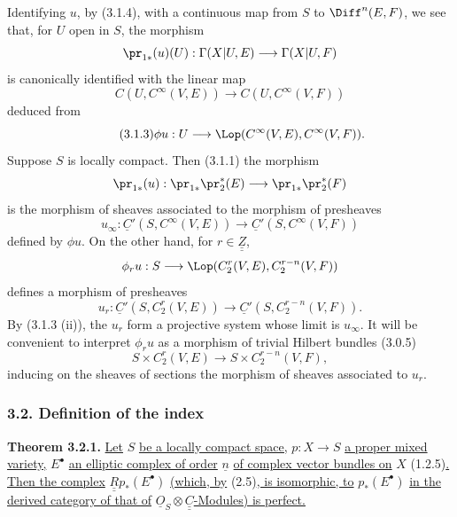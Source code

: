 %
Identifying $u$, by (3.1.4), with a continuous map from $S$ to $\Diff^n(E,F)$, we see that, for $U$ open in $S$, the morphism
\[
  \pr_{1*}(u)(U):\Gamma(X|U,E)\longrightarrow \Gamma(X|U,F)
\]
is canonically identified with the linear map
\[
  C(U,C^\infty(V,E))\longrightarrow C(U,C^\infty(V,F))
\]
deduced from
\begin{equation}\tag{3.1.3}
  \phi u:U\longrightarrow \Lop(C^\infty(V,E),C^\infty(V,F)).
\end{equation}
Suppose $S$ is locally compact. Then (3.1.1) the morphism
\[
  \pr_{1*}(u):\pr_{1*}\pr_2^*(E)
  \longrightarrow \pr_{1*}\pr_2^*(F)
\]
is the morphism of sheaves associated to the morphism of presheaves
\[
  u_\infty:\underline C'(S,C^\infty(V,E))
  \longrightarrow \underline C'(S,C^\infty(V,F))
\]
defined by $\phi u$. On the other hand, for $r\in\underline{\underline{Z}}$,
\[
  \phi_r u:S\longrightarrow \Lop(C^r_2(V,E),C^{r-n}_2(V,F))
\]
defines a morphism of presheaves
\[
  u_r:\underline C'(S,C^r_2(V,E))
  \longrightarrow \underline C'(S,C^{r-n}_2(V,F)).
\]
By (3.1.3 (ii)), the $u_r$ form a projective system whose limit is $u_\infty$. It will be convenient to interpret $\phi_r u$ as a morphism of trivial Hilbert bundles (3.0.5)
\[
  S\times C^r_2(V,E)\longrightarrow S\times C^{r-n}_2(V,F),
\]
%
inducing on the sheaves of sections the morphism of sheaves associated to $u_r$.

\subsubsection*{3.2. Definition of the index}
\textbf{Theorem 3.2.1.} \uline{Let} $S$ \uline{be a locally compact space,} $p:X\to S$ \uline{a proper mixed variety,} $E^\bullet$ \uline{an elliptic complex of order} $\underline{n}$ \uline{of complex vector bundles on} $X$ (1.2.5)\uline{. Then the complex} $\underline{\underline{R}}p_*(E^\bullet)$ \uline{(which, by} (2.5)\uline{, is isomorphic, to} $p_*(E^\bullet)$ \uline{in the derived category of that of} $\underline{O}_S\otimes\underline{\underline{C}}$\uline{-Modules) is perfect.}

